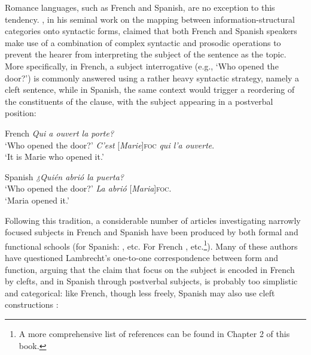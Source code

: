 Romance languages, such as French and Spanish, are no exception to this tendency. \textcite{lambrecht1996information}, in his seminal work on the mapping between information-structural categories onto syntactic forms, claimed that both French and Spanish speakers make use of a combination of complex syntactic and prosodic operations to prevent the hearer from interpreting the subject of the sentence as the topic. More specifically, in French, a subject interrogative (e.g., `Who opened the door?') is commonly answered using a rather heavy syntactic strategy, namely a cleft sentence, while in Spanish, the same context would trigger a reordering of the constituents of the clause, with the subject appearing in a postverbal position:

 \ea \label{ex2}  {French}
\ea \textit{Qui a ouvert la porte?}\\
 ‘Who opened the door?'
\ex \textit{C'est}  {[\textit{Marie}]\textsc{foc}} \normalsize \textit{qui l'a ouverte}.\\
`It is Marie who opened it.'

\z \z 

 \ea \label{ex3}  {Spanish}
\ea \textit{¿Quién abrió la puerta?}\\
 ‘Who opened the door?'
\ex \textit{La abrió} {[\textit{Maria}]\textsc{foc}}\normalsize.\\
`Maria opened it.'

\z \z 

Following this tradition, a considerable number of articles investigating narrowly focused subjects in French and Spanish have been produced by both formal and functional schools (for Spanish: \cite{zubizarreta1998prosody, costa2001postverbal, samek2001crosslinguistic, gutierrez2013structural, gabriel2007fokus, gabriel2010focus, heidinger2013information, uth2014spanish, cabrera1999funciones, feldhausen2015oraciones}, etc. For French \cite{prince1978comparison, sornicola1988clefts, dufter2009focus, apotheloz2012pseudo, blanche1990franccais, roubaud2000constructions, fery2001focus, choi2005gens, lahousse2006, Lahousse2011, lahousse2012word, destruel2012french, karssenberg2017oiseaux, karssenberg20186}, etc.\footnote{A more comprehensive list of references can be found in Chapter 2 of this book.}). Many of these authors have questioned Lambrecht's one-to-one correspondence between form and function, arguing that the claim that focus on the subject is encoded in French by clefts, and in Spanish through postverbal subjects, is probably too simplistic and categorical: like French, though less freely, Spanish may also use cleft constructions \parencite{cabrera1999funciones, feldhausen2015oraciones}:

